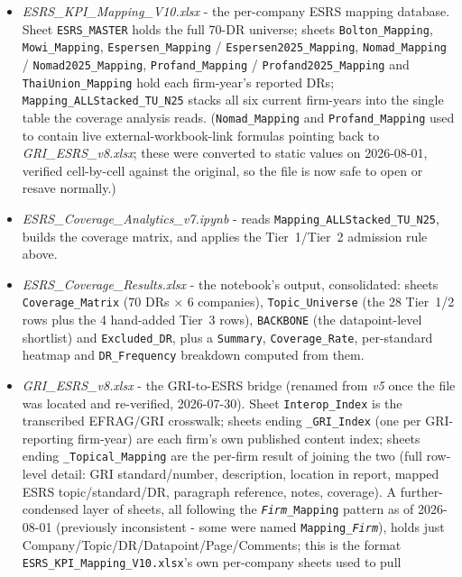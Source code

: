 \documentclass[
]{article}
\begin{document}
\begin{itemize}
\item \emph{ESRS\_KPI\_Mapping\_V10.xlsx} - the per-company ESRS mapping
  database. Sheet \texttt{ESRS\_MASTER} holds the full 70-DR universe;
  sheets \texttt{Bolton\_Mapping}, \texttt{Mowi\_Mapping},
  \texttt{Espersen\_Mapping} / \texttt{Espersen2025\_Mapping},
  \texttt{Nomad\_Mapping} / \texttt{Nomad2025\_Mapping},
  \texttt{Profand\_Mapping} / \texttt{Profand2025\_Mapping} and
  \texttt{ThaiUnion\_Mapping} hold each firm-year's reported DRs;
  \texttt{Mapping\_ALLStacked\_TU\_N25} stacks all six current firm-years into
  the single table the coverage analysis reads. (\texttt{Nomad\_Mapping} and
  \texttt{Profand\_Mapping} used to contain live external-workbook-link
  formulas pointing back to \emph{GRI\_ESRS\_v8.xlsx}; these were converted
  to static values on 2026-08-01, verified cell-by-cell against the original,
  so the file is now safe to open or resave normally.)
\item \emph{ESRS\_Coverage\_Analytics\_v7.ipynb} - reads
  \texttt{Mapping\_ALLStacked\_TU\_N25}, builds the coverage matrix, and
  applies the Tier~1/Tier~2 admission rule above.
\item \emph{ESRS\_Coverage\_Results.xlsx} - the notebook's output, consolidated:
  sheets \texttt{Coverage\_Matrix} (70 DRs $\times$ 6 companies), \texttt{Topic\_Universe}
  (the 28 Tier~1/2 rows plus the 4 hand-added Tier~3 rows), \texttt{BACKBONE}
  (the datapoint-level shortlist) and \texttt{Excluded\_DR}, plus a
  \texttt{Summary}, \texttt{Coverage\_Rate}, per-standard heatmap and
  \texttt{DR\_Frequency} breakdown computed from them.
\item \emph{GRI\_ESRS\_v8.xlsx} - the GRI-to-ESRS bridge (renamed from
  \emph{v5} once the file was located and re-verified, 2026-07-30). Sheet
  \texttt{Interop\_Index} is the transcribed EFRAG/GRI crosswalk;
  sheets ending \texttt{\_GRI\_Index} (one per GRI-reporting firm-year) are
  each firm's own published content index; sheets ending
  \texttt{\_Topical\_Mapping} are the per-firm result of joining the two
  (full row-level detail: GRI standard/number, description, location in
  report, mapped ESRS topic/standard/DR, paragraph reference, notes,
  coverage). A further-condensed layer of sheets, all following the
  \texttt{\emph{Firm}\_Mapping} pattern as of 2026-08-01 (previously
  inconsistent - some were named \texttt{Mapping\_\emph{Firm}}), holds
  just Company/Topic/DR/Datapoint/Page/Comments; this is the format
  \texttt{ESRS\_KPI\_Mapping\_V10.xlsx}'s own per-company sheets used to pull

\end{itemize}
\end{document}
